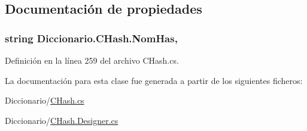 \subsection{Documentación de propiedades}
\hypertarget{class_diccionario_1_1_c_hash_adb91b6401e6686dcdd4e1f77ccd5eb51}{
\subsubsection[{Nom\-Has}]{\setlength{\rightskip}{0pt plus 5cm}string Diccionario.\-C\-Hash.\-Nom\-Has\hspace{0.3cm}{\ttfamily [get]}, {\ttfamily [set]}}}\label{class_diccionario_1_1_c_hash_adb91b6401e6686dcdd4e1f77ccd5eb51}


Definición en la línea 259 del archivo C\-Hash.\-cs.



La documentación para esta clase fue generada a partir de los siguientes ficheros\-:\begin{DoxyCompactItemize}
\item 
Diccionario/\hyperlink{_c_hash_8cs}{C\-Hash.\-cs}\item 
Diccionario/\hyperlink{_c_hash_8_designer_8cs}{C\-Hash.\-Designer.\-cs}\end{DoxyCompactItemize}
